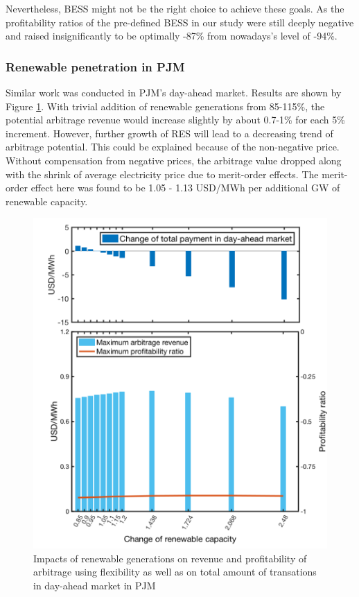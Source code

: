 Nevertheless, BESS might not be the right choice to achieve these goals. As the profitability ratios of the pre-defined BESS in our study were still deeply negative and raised insignificantly to be optimally -87\% from nowadays's level of -94\%.

\subsubsection{Renewable penetration in PJM}

Similar work was conducted in PJM's day-ahead market. Results are shown by Figure \ref{fig:renew_pjm}. With trivial addition of renewable generations from 85-115\%, the potential arbitrage revenue would increase slightly by about 0.7-1\% for each 5\% increment. However, further growth of RES will lead to a decreasing trend of arbitrage potential. This could be explained because of the non-negative price. Without compensation from negative prices, the arbitrage value dropped along with the shrink of average electricity price due to merit-order effects. The merit-order effect here was found to be 1.05 - 1.13 USD/MWh per additional GW of renewable capacity.

\begin{figure}[h!]
	\centering
	\includegraphics[width=0.95\linewidth]{Figures/RenewablePenetration_PJM}
	\caption{Impacts of renewable generations on revenue and profitability of arbitrage using flexibility as well as on total amount of transations in day-ahead market in PJM}
	\label{fig:renew_pjm}
\end{figure}

